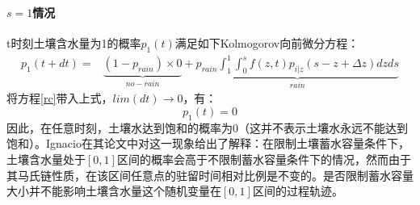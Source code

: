  


\paragraph{$s=1$情况} 
t时刻土壤含水量为1的概率$p_1(t)$满足如下Kolmogorov向前微分方程：
\begin{equation}
\label{basic00}
\begin{split}
p_1(t+dt)=&\underbrace{(1-p_{rain})\times 0}_{no-rain}+\underbrace{p_{rain} \int_{1}^{1}\int_{0}^{s} f(z,t)p_{i|z}(s-z+\Delta z)dzds}_{rain}
\end{split}
\end{equation}
将方程\ref{rc}带入上式，$lim(dt) \to 0$，有：
\begin{equation}
p_1(t)=0
\end{equation} 
因此，在任意时刻，土壤水达到饱和的概率为$0$（这并不表示土壤水永远不能达到饱和）。Ignacio在其论文中对这一现象给出了解释\cite{rodriguez1999probabilistic}：在限制土壤蓄水容量条件下，土壤含水量处于$[0,1]$区间的概率会高于不限制蓄水容量条件下的情况，然而由于其马氏链性质，在该区间任意点的驻留时间相对比例是不变的。是否限制蓄水容量大小并不能影响土壤含水量这个随机变量在$[0,1]$区间的过程轨迹。
\iffalse
It  is initially  surprising  that  the  atom  of probability 
at  1  -  s  in  the 
state-dependent  distribution  b(y;  s)  of  jumps  in  soil  moisture  has  not  been  used  explicitly  in  the  above  derivation.  In  fact,  the  only  effect  of  the  saturation  of  the  soil  at  s  =  1  is  the  restricted  range  over  which  p(s)  is  normalized  in  (4.8).  The  explanation  for  this  lies  in  the  Markov nature  of  the  soil  moisture  process.  If  excursions  of  the  process  above  unity  are  impossible,  the  process  will  spend  more  time  in  states  {s:  s  <  1}  than  would  be  the  case  otherwise,  but  the  relative  proportions  of  times  in  those  states  will  be  unchanged.  For,  imagine  two  processes  with,  and  without,  the  restriction  to  s  <  1.  In  the  latter  case,  trajectories  of  the  soil  moisture  process  will  jump  above  the  level  s  -  1  and,  eventually,  drift  down  across  this  level  once  more.  In  the  former  case,  these  excursions  are  effectively  excised,  as  the  process  jumps  only  to  s  =  1 and  then  immediately  begins  its  downward  decay.  The  trajectories  below  s  =  1  in  the  two  processes  are  indistinguishable.  
\fi 

